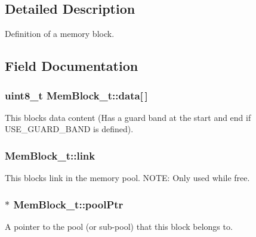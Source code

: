 \subsection{Detailed Description}
Definition of a memory block. 

\subsection{Field Documentation}
\subsubsection[{\texorpdfstring{data}{data}}]{\setlength{\rightskip}{0pt plus 5cm}uint8\+\_\+t Mem\+Block\+\_\+t\+::data\mbox{[}$\,$\mbox{]}}\hypertarget{struct_mem_block__t_af21d99beab2de7545d5abb599e82244f}{}\label{struct_mem_block__t_af21d99beab2de7545d5abb599e82244f}
This block\textquotesingle{}s data content (Has a guard band at the start and end if U\+S\+E\+\_\+\+G\+U\+A\+R\+D\+\_\+\+B\+A\+ND is defined). 
\subsubsection[{\texorpdfstring{link}{link}}]{ Mem\+Block\+\_\+t\+::link}\hypertarget{struct_mem_block__t_a92958a9db98d763100a51b11733fe970}{}\label{struct_mem_block__t_a92958a9db98d763100a51b11733fe970}
This block\textquotesingle{}s link in the memory pool. N\+O\+TE\+: Only used while free. 
\subsubsection[{\texorpdfstring{pool\+Ptr}{poolPtr}}]{$\ast$ Mem\+Block\+\_\+t\+::pool\+Ptr}\hypertarget{struct_mem_block__t_a0e137ad966d8a91f13d8b78c6d353314}{}\label{struct_mem_block__t_a0e137ad966d8a91f13d8b78c6d353314}


A pointer to the pool (or sub-\/pool) that this block belongs to. 

